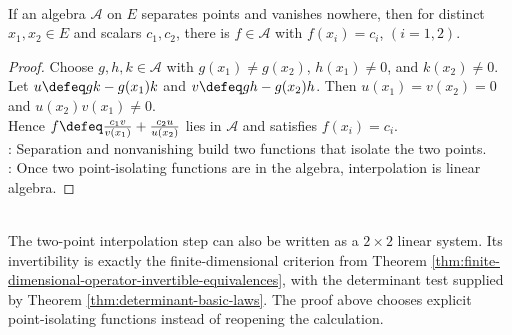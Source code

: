 \begin{theorem} \label{thm:two-point-interpolation-in-separating-algebra} \\
If an algebra $\mathcal{A}$ on $E$ separates points and vanishes nowhere, then for distinct $x_1,x_2\in E$ and scalars $c_1,c_2$, there is $f\in\mathcal{A}$ with $f(x_i)=c_i$, $(i=1,2)$.
\begin{proof}
Choose $g,h,k\in\mathcal{A}$ with $g(x_1)\neq g(x_2)$, $h(x_1)\neq0$, and $k(x_2)\neq0$.\\
Let $u\defeq gk-g(x_1)k$ and $v\defeq gh-g(x_2)h$. Then $u(x_1)=v(x_2)=0$ and $u(x_2)v(x_1)\neq0$.\\
Hence $f\defeq \frac{c_1v}{v(x_1)}+\frac{c_2u}{u(x_2)}$ lies in $\mathcal{A}$ and satisfies $f(x_i)=c_i$.\\
: Separation and nonvanishing build two functions that isolate the two points.\\
: Once two point-isolating functions are in the algebra, interpolation is linear algebra.
\end{proof}
\end{theorem}

\begin{perspective} \label{per:stone-weierstrass-interpolation-linear-algebra} \\
The two-point interpolation step can also be written as a $2\times2$ linear system. Its invertibility is exactly the finite-dimensional criterion from Theorem \ref{thm:finite-dimensional-operator-invertible-equivalences}, with the determinant test supplied by Theorem \ref{thm:determinant-basic-laws}. The proof above chooses explicit point-isolating functions instead of reopening the calculation.
\end{perspective}

